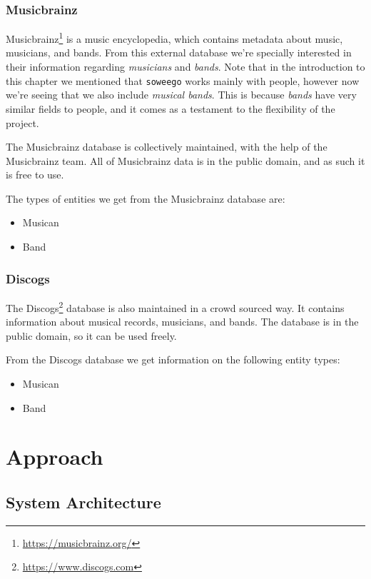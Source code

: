 \documentclass[epsfig,a4paper,11pt,titlepage,twoside,openany]{book}
\newcommand{\footurl}[1]{\footnote{\url{#1}}}
\begin{document}
\subsection{Musicbrainz}
\label{sec:catalog-musicbrainz}

Musicbrainz\footurl{https://musicbrainz.org/} is a music encyclopedia, which contains metadata about music, musicians, and bands. From this external database we're specially interested in their information regarding \textit{musicians} and \textit{bands}. Note that in the introduction to this chapter we mentioned that \texttt{soweego} works mainly with people, however now we're seeing that we also include \textit{musical bands}. This is because \textit{bands} have very similar fields to people, and it comes as a testament to the flexibility of the project.

The Musicbrainz database is collectively maintained, with the help of the Musicbrainz team. All of Musicbrainz data is in the public domain, and as such it is free to use.

The types of entities we get from the Musicbrainz database are:

\begin{itemize}
\item Musican
\item Band
\end{itemize}


\subsection{Discogs}
\label{sec:catalog-discogs}

The Discogs\footurl{https://www.discogs.com} database is also maintained in a crowd sourced way. It contains information about musical records, musicians, and bands. The database is in the public domain, so it can be used freely.

From the Discogs database we get information on the following entity types:

\begin{itemize}
\item Musican
\item Band
\end{itemize}


\chapter{Approach}
\label{chap:apprach}


\section{System Architecture}
\label{sec:system-architecture}
\end{document}
